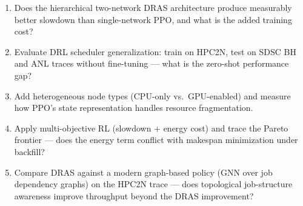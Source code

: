 \documentclass[11pt]{article}
\begin{document}
\begin{enumerate}[leftmargin=1.6em,itemsep=0.2em,topsep=0.2em,label=Q\arabic*.]
\item Does the hierarchical two-network DRAS architecture produce measurably better slowdown than single-network PPO, and what is the added training cost?
\item Evaluate DRL scheduler generalization: train on HPC2N, test on SDSC BH and ANL traces without fine-tuning --- what is the zero-shot performance gap?
\item Add heterogeneous node types (CPU-only vs.\ GPU-enabled) and measure how PPO's state representation handles resource fragmentation.
\item Apply multi-objective RL (slowdown + energy cost) and trace the Pareto frontier --- does the energy term conflict with makespan minimization under backfill?
\item Compare DRAS against a modern graph-based policy (GNN over job dependency graphs) on the HPC2N trace --- does topological job-structure awareness improve throughput beyond the DRAS improvement?
\end{enumerate}
\end{document}
